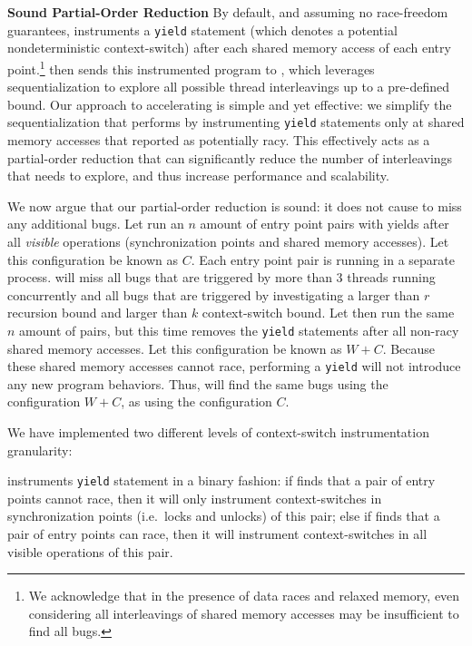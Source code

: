\medskip\noindent\textbf{Sound Partial-Order Reduction }
%
By default, and assuming no race-freedom guarantees, \whoop instruments a \texttt{yield} statement (which denotes a potential nondeterministic context-switch) after each shared memory access of each entry point.\footnote{We acknowledge that in the presence of data races and relaxed memory, even considering all interleavings of shared memory accesses may be insufficient to find all bugs.}  \whoop then sends this instrumented program to \corral, which leverages sequentialization to explore all possible thread interleavings up to a pre-defined bound. Our approach to accelerating \corral is simple and yet effective: we simplify the sequentialization that \corral performs by instrumenting \texttt{yield} statements only at shared memory accesses that \whoop reported as potentially racy. This effectively acts as a partial-order reduction that can significantly reduce the number of interleavings that \corral needs to explore, and thus increase performance and scalability.

We now argue that our partial-order reduction is sound: it does not cause \corral to miss any additional bugs.
Let \corral run an $n$ amount of entry point pairs with yields after all \emph{visible} operations (synchronization points and shared memory accesses). Let this configuration be known as $C$. Each entry point pair is running in a separate \corral process. \corral will miss all bugs that are triggered by more than 3 threads running concurrently and all bugs that are triggered by investigating a larger than $r$ recursion bound and larger than $k$ context-switch bound. Let \corral then run the same $n$ amount of pairs, but this time \whoop removes the \texttt{yield} statements after all non-racy shared memory accesses. Let this configuration be known as $W+C$. Because these shared memory accesses cannot race, performing a \texttt{yield} will not introduce any new program behaviors. Thus, \corral will find the same bugs using the configuration $W+C$, as using the configuration $C$.

We have implemented two different levels of context-switch instrumentation granularity:

\yieldcoarse instruments \texttt{yield} statement in a binary fashion: if \whoop
finds that a pair of entry points cannot race, then it will only instrument
context-switches in synchronization points (i.e.\ locks and unlocks) of this pair; else if \whoop finds
that a pair of entry points can race, then it will instrument context-switches
in all visible operations of this pair.

